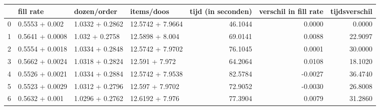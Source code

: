 \begin{tabular}{llllrrr}
\toprule
{} &        fill rate &      dozen/order &        items/doos &  tijd (in seconden) &  verschil in fill rate &  tijdsverschil \\
\midrule
0 &   0.5553 + 0.002 &  1.0332 + 0.2862 &  12.5742 + 7.9664 &             46.1044 &                 0.0000 &         0.0000 \\
1 &  0.5641 + 0.0008 &   1.032 + 0.2758 &   12.5898 + 8.004 &             69.0141 &                 0.0088 &        22.9097 \\
2 &  0.5554 + 0.0018 &  1.0334 + 0.2848 &  12.5742 + 7.9702 &             76.1045 &                 0.0001 &        30.0000 \\
3 &  0.5662 + 0.0024 &  1.0318 + 0.2824 &    12.591 + 7.972 &             64.2064 &                 0.0108 &        18.1020 \\
4 &  0.5526 + 0.0021 &  1.0334 + 0.2884 &  12.5742 + 7.9538 &             82.5784 &                -0.0027 &        36.4740 \\
5 &  0.5523 + 0.0029 &  1.0312 + 0.2796 &   12.597 + 7.9702 &             72.9052 &                -0.0030 &        26.8008 \\
6 &   0.5632 + 0.001 &  1.0296 + 0.2762 &   12.6192 + 7.976 &             77.3904 &                 0.0079 &        31.2860 \\
\bottomrule
\end{tabular}
